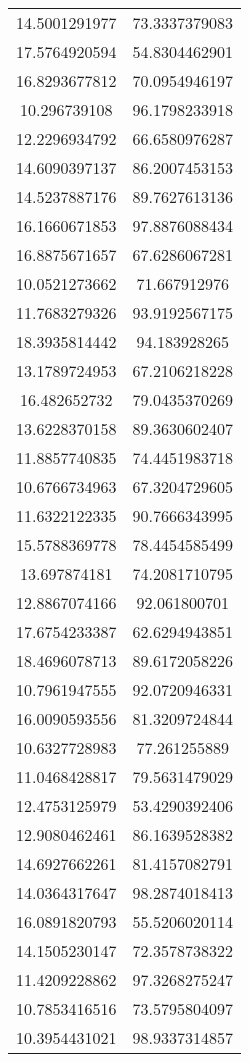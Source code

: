 \begin{table}
\begin{tabular}{cc}
14.5001291977 & 73.3337379083 \\
17.5764920594 & 54.8304462901 \\
16.8293677812 & 70.0954946197 \\
10.296739108 & 96.1798233918 \\
12.2296934792 & 66.6580976287 \\
14.6090397137 & 86.2007453153 \\
14.5237887176 & 89.7627613136 \\
16.1660671853 & 97.8876088434 \\
16.8875671657 & 67.6286067281 \\
10.0521273662 & 71.667912976 \\
11.7683279326 & 93.9192567175 \\
18.3935814442 & 94.183928265 \\
13.1789724953 & 67.2106218228 \\
16.482652732 & 79.0435370269 \\
13.6228370158 & 89.3630602407 \\
11.8857740835 & 74.4451983718 \\
10.6766734963 & 67.3204729605 \\
11.6322122335 & 90.7666343995 \\
15.5788369778 & 78.4454585499 \\
13.697874181 & 74.2081710795 \\
12.8867074166 & 92.061800701 \\
17.6754233387 & 62.6294943851 \\
18.4696078713 & 89.6172058226 \\
10.7961947555 & 92.0720946331 \\
16.0090593556 & 81.3209724844 \\
10.6327728983 & 77.261255889 \\
11.0468428817 & 79.5631479029 \\
12.4753125979 & 53.4290392406 \\
12.9080462461 & 86.1639528382 \\
14.6927662261 & 81.4157082791 \\
14.0364317647 & 98.2874018413 \\
16.0891820793 & 55.5206020114 \\
14.1505230147 & 72.3578738322 \\
11.4209228862 & 97.3268275247 \\
10.7853416516 & 73.5795804097 \\
10.3954431021 & 98.9337314857 \\

\end{tabular}
\end{table}
